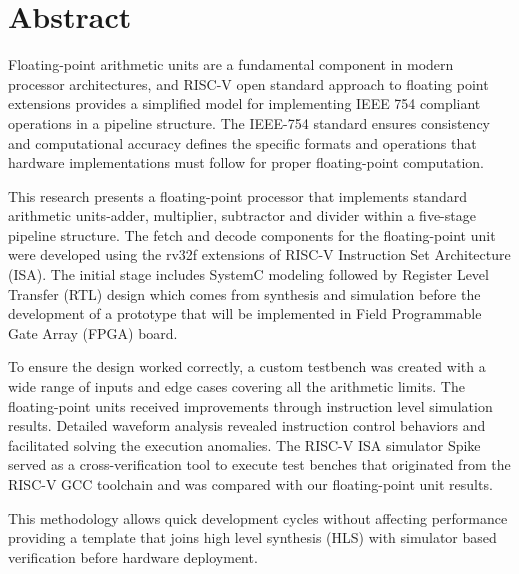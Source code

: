\chapter*{Abstract}

Floating-point arithmetic units are a fundamental component in modern processor architectures, and RISC-V open standard approach to floating point extensions provides a simplified model for implementing IEEE 754 compliant operations in a pipeline structure. The IEEE-754 standard ensures consistency and computational accuracy defines the specific formats and operations that hardware implementations must follow for proper floating-point computation.

This research presents a floating-point processor that implements standard arithmetic units-adder, multiplier, subtractor and divider within a five-stage pipeline structure. The fetch and decode components for the floating-point unit were developed using the rv32f extensions of RISC-V Instruction Set Architecture (ISA). The initial stage includes SystemC modeling followed by Register Level Transfer (RTL) design which comes from synthesis and simulation before the development of a prototype that will be implemented in Field Programmable Gate Array (FPGA) board.

To ensure the design worked correctly, a custom testbench was created with a wide range of inputs and edge cases covering all the arithmetic limits. The floating-point units received improvements through instruction level simulation results. Detailed waveform analysis revealed instruction control behaviors and facilitated solving the execution anomalies. The RISC-V ISA simulator Spike served as a cross-verification tool to execute test benches that originated from the RISC-V GCC toolchain and was compared with our floating-point unit results. 

This methodology allows quick development cycles without affecting performance providing a template that joins high level synthesis (HLS)  with simulator based verification before hardware deployment.